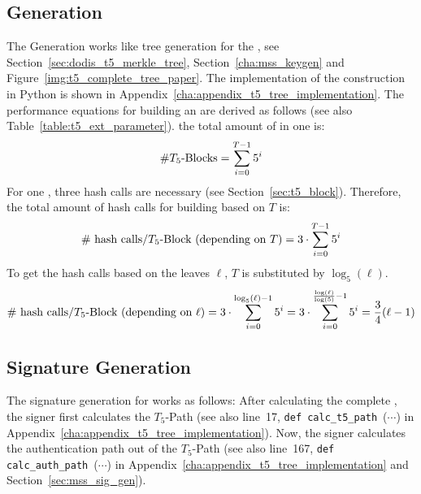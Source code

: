 \subsection{\texorpdfstring{\extree}{Ext. T5-Tree} Generation}
The \extree Generation works like tree generation for the \tftree, see Section~\ref{sec:dodis_t5_merkle_tree}, Section~\ref{cha:mss_keygen} and Figure~\ref{img:t5_complete_tree_paper}. The implementation of the \extree construction in Python is shown in Appendix~\ref{cha:appendix_t5_tree_implementation}.
% 
The performance equations for building an \extree are derived as follows (see also Table~\ref{table:t5_ext_parameter}). the total amount of \tfblocks in one \extree is:
\begin{equation}
\text{\#$T_5$-Blocks} = \sum_{i=0}^{T-1} 5^i
\end{equation} 
For one \tfblock, three hash calls are necessary (see Section~\ref{sec:t5_block}). Therefore, the total amount of hash calls for building \extree based on $T$ is:\\
\begin{equation}
\text{\# hash calls/\tfblock (depending on $T$)} = 3 \cdot \sum_{i=0}^{T-1} 5^i
\end{equation}
To get the hash calls based on the leaves $\ell$, $T$ is substituted by $\log_5(\ell)$.
\begin{equation}
\text{\# hash calls/\tfblock (depending on $\ell$)}=3 \cdot \sum_{i=0}^{\log_5(\ell)-1} 5^i = 3 \cdot \sum_{i=0}^{\frac{\log(\ell)}{\log(5)}-1} 5^i = \frac{3}{4} (\ell-1)
\end{equation}

\subsection{\texorpdfstring{\extree}{Ext. T5-Tree} Signature Generation}
The signature generation for \extree works as follows: After calculating the complete \extree, the signer first calculates the $T_5$-Path (see also line~17, \texttt{def calc_t5_path}~($\cdots$) in Appendix~\ref{cha:appendix_t5_tree_implementation}).
Now, the signer calculates the authentication path out of the $T_5$-Path (see also line~167, \texttt{def calc_auth_path}~($\cdots$) in Appendix~\ref{cha:appendix_t5_tree_implementation} and Section~\ref{sec:mss_sig_gen}).

